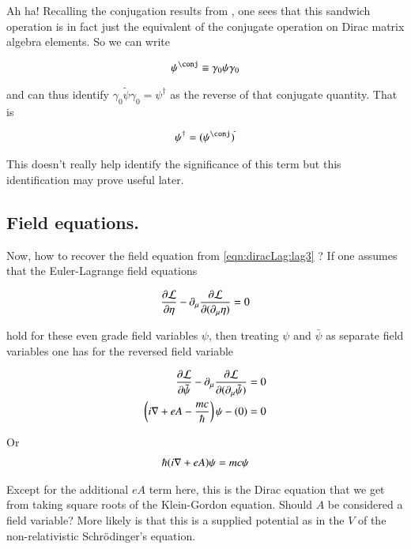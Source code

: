 Ah ha!  Recalling the conjugation results from , one sees that this sandwich operation is in fact just the equivalent of the conjugate operation on Dirac matrix algebra elements.  So we can write

\begin{align*}
\psi^\conj \equiv \gamma_0 \psi \gamma_0
\end{align*}

and can thus identify $\gamma_0 \tilde{\psi} \gamma_0 = \psi^\dagger$ as the reverse of that conjugate quantity.  That is

\begin{align*}
\psi^\dagger = (\psi^\conj)^{\tilde{}}
\end{align*}

This doesn't really help identify the significance of this term but this identification may prove useful later.

\subsection{Field equations. }

Now, how to recover the field equation from \ref{eqn:diracLag:lag3} 
?  If one assumes that the Euler-Lagrange field equations

\begin{align*}
\frac{\partial {\mathcal{L}}}{\partial {\eta}} - \partial_\mu \frac{\partial {\mathcal{L}}}{\partial {(\partial_\mu \eta)}} = 0
\end{align*}

hold for these even grade field variables $\psi$, then treating $\psi$ and $\bar \psi$ as separate field variables one has for the reversed field variable

\begin{align*}
\frac{\partial {\mathcal{L}}}{\partial {\tilde{\psi}}} - \partial_\mu \frac{\partial {\mathcal{L}}}{\partial {(\partial_\mu \tilde{\psi})}} &= 0 \\
\left( i \nabla + e A - \frac{mc}{\hbar}\right) \psi - (0) &= 0
\end{align*}

Or 
\begin{align*}
\hbar (i \nabla + e A) \psi = mc \psi
\end{align*}

Except for the additional $e A$ term here, this is the Dirac equation that we get from taking square roots of the Klein-Gordon equation.  Should $A$ be considered a field variable?  More likely is that this is a supplied potential as in the $V$ of the non-relativistic 
Schr\"{o}dinger's equation.


